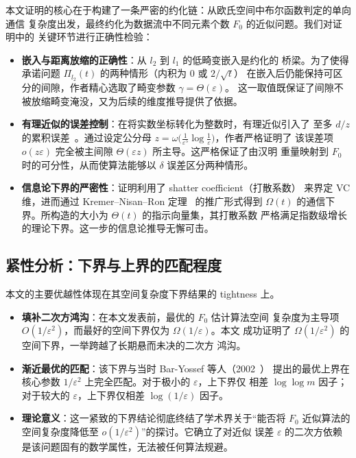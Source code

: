 \documentclass[UTF8, 11pt, a4paper, linestretch=1.15]{ctexart}
\theoremstyle{zhstyle}
\newcommand{\eps}{\varepsilon}
\newcommand{\Fzero}{F_0}
\begin{document}
	本文证明的核心在于构建了一条严密的约化链：从欧氏空间中布尔函数判定的单向通信
	复杂度出发，最终约化为数据流中不同元素个数 $\Fzero$ 的近似问题。我们对证明中的
	关键环节进行正确性检验：
	
	\begin{itemize}
		\item \textbf{嵌入与距离放缩的正确性}：从 $l_2$ 到 $l_1$ 的低畸变嵌入是约化的
		桥梁。为了使得承诺问题 $\Pi_{l_2}(t)$ 的两种情形（内积为 $0$ 或 $2/\sqrt{t}$）
		在嵌入后仍能保持可区分的间隙，作者精心选取了畸变参数 $\gamma = \Theta(\eps)$。
		这一取值既保证了间隙不被放缩畸变淹没，又为后续的维度推导提供了依据。
		\item \textbf{有理近似的误差控制}：在将实数坐标转化为整数时，有理近似引入了
		至多 $d/z$ 的累积误差~\cite{IW03}。通过设定公分母
		$z = \omega\big(\tfrac{1}{\eps^5} \log \tfrac{1}{\eps}\big)$，作者严格证明了
		该误差项 $o(z\eps)$ 完全被主间隙 $\Theta(\eps z)$ 所主导。这严格保证了由汉明
		重量映射到 $\Fzero$ 时的可分性，从而使算法能够以 $\delta$ 误差区分两种情形。
		\item \textbf{信息论下界的严密性}：证明利用了 shatter coefficient（打散系数）
		来界定 VC 维，进而通过 Kremer--Nisan--Ron 定理~\cite{KNR99} 的推广形式得到
		$\Omega(t)$ 的通信下界。所构造的大小为 $\Theta(t)$ 的指示向量集，其打散系数
		严格满足指数级增长的理论下界。这一步的信息论推导无懈可击。
	\end{itemize}
	
	\subsection{紧性分析：下界与上界的匹配程度}
	
	本文的主要优越性体现在其空间复杂度下界结果的 tightness 上。
	
	\begin{itemize}
		\item \textbf{填补二次方鸿沟}：在本文发表前，最优的 $\Fzero$ 估计算法空间
		复杂度为主导项 $O(1/\eps^2)$，而最好的空间下界仅为 $\Omega(1/\eps)$。本文
		成功证明了 $\Omega(1/\eps^2)$ 的空间下界，一举跨越了长期悬而未决的二次方
		鸿沟。
		\item \textbf{渐近最优的匹配}：该下界与当时 Bar-Yossef 等人（2002~\cite{BJKST02}）
		提出的最优上界在核心参数 $1/\eps^2$ 上完全匹配。对于极小的 $\eps$，上下界仅
		相差 $\log\log m$ 因子；对于较大的 $\eps$，上下界仅相差 $\log(1/\eps)$ 因子。
		\item \textbf{理论意义}：这一紧致的下界结论彻底终结了学术界关于“能否将
		$\Fzero$ 近似算法的空间复杂度降低至 $o(1/\eps^2)$”的探讨。它确立了对近似
		误差 $\eps$ 的二次方依赖是该问题固有的数学属性，无法被任何算法规避。
	\end{itemize}
	
\end{document}
